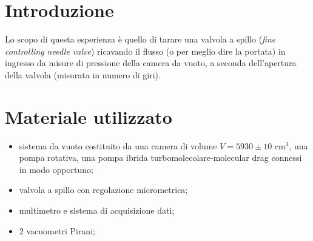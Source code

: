 \section{Introduzione}

Lo scopo di questa esperienza è quello di tarare una valvola a spillo (\textit{fine controlling needle valve}) ricavando il flusso (o per meglio dire la portata) in ingresso da misure di pressione della camera da vuoto, a seconda dell'apertura della valvola (misurata in numero di giri).

\section{Materiale utilizzato}

\begin{itemize}
	\item{sistema da vuoto costituito da una camera di volume $V = 5930 \pm 10$ \si{\centi\metre}$^3$, una pompa rotativa, una pompa ibrida turbomolecolare-molecular drag connessi in modo opportuno;}
	\item{valvola a spillo con regolazione micrometrica;}
	\item{multimetro e sistema di acquisizione dati;}
	\item{2 vacuometri Pirani;}
\end{itemize}

